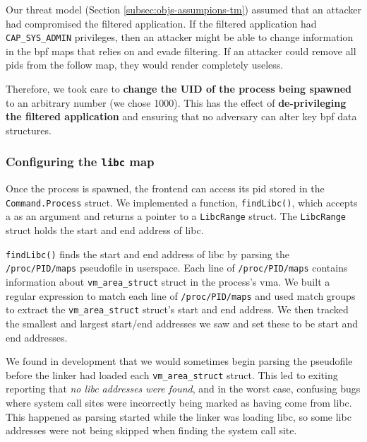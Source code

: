 Our threat model (Section \ref{subsec:objs-assumpions-tm}) assumed that an attacker
had compromised the filtered application. If the filtered application had
\texttt{CAP\_SYS\_ADMIN} privileges, then an attacker might be able to change
information in the \ac{bpf} maps that \af relies on and evade filtering. If an
attacker could remove all \acp{pid} from the follow map, they would render
\af completely useless. 

Therefore, we took care to \textbf{change the UID of the process being spawned}
to an arbitrary number (we chose 1000). This has the effect of
\textbf{de-privileging the filtered application} and ensuring that no adversary
can alter key \ac{bpf} data structures.


\subsubsection{Configuring the \texttt{libc} map}
Once the process is spawned, the frontend can access its \ac{pid} stored in the
\texttt{Command.Process} struct. We implemented a function, 
\texttt{findLibc()}, which accepts a  as an argument and returns a pointer to 
a \texttt{LibcRange}  struct. The \texttt{LibcRange} struct holds the start and end 
address of \ac{libc}.

\texttt{findLibc()} finds the start and end address of \ac{libc} by parsing the
\texttt{/proc/PID/maps} pseudofile in userspace. Each line of \texttt{/proc/PID/maps}
contains information about \texttt{vm\_area\_struct} struct in the process's \ac{vma}. We
built a regular expression to match each line of \texttt{/proc/PID/maps} and
used match groups to extract the \texttt{vm\_area\_struct} struct's start and end address.
We then tracked the smallest and largest start/end addresses we saw 
and set these to be  start and end addresses.

We found in development that we would sometimes begin parsing the pseudofile
before the linker had loaded each \texttt{vm\_area\_struct} struct. This led to
\af exiting reporting that \textit{no \ac{libc} addresses were found}, and in
the worst case, confusing bugs where system call sites were incorrectly being marked as 
having come from \ac{libc}. This happened as parsing started while the
linker was loading \ac{libc}, so some \ac{libc} addresses were not being skipped
when finding the system call site.

